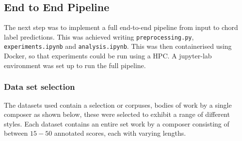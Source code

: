 \documentclass[12pt,a4paper,twoside,openright]{report}
\DeclareMathOperator*{\argmax}{arg\,max}
\theoremstyle{definition}
\begin{document}
%
%
%
%
%
%


\subsection{End to End Pipeline}
The next step was to implement a full end-to-end pipeline from input to chord label predictions.
This was achieved writing \texttt{preprocessing.py}, \texttt{experiments.ipynb} and \texttt{analysis.ipynb}. This was then containerised using Docker, so that experiments could be run using a HPC. A jupyter-lab environment was set up to run the full pipeline.


\subsubsection{Data set selection}

The datasets used contain a selection or corpuses, bodies of work by a single composer as shown below, these were selected to exhibit a range of different styles. 
Each dataset contains an entire set work by a composer consisting of between $15-50$ annotated scores, each with varying lengths.
\end{document}
